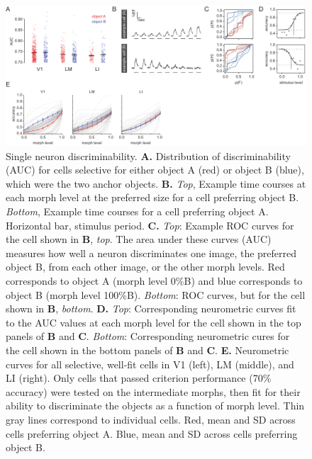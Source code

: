 \begin{figure}[t!]
    \includegraphics[width=\textwidth]{figures/chapter_4/fig_4-3_neurometric/fig_4-3_neurometric.pdf}
    \caption[Single neuron discriminability]{Single neuron discriminability. 
    \textbf{A.} Distribution of discriminability (AUC) for cells selective for either object A (red) or object B (blue), which were the two anchor objects.
    \textbf{B.} \textit{Top}, Example time courses at each morph level at the preferred size for a cell preferring object B. \textit{Bottom}, Example time courses for a cell preferring object A. Horizontal bar, stimulus period. 
    \textbf{C.} \textit{Top}: Example ROC curves for the cell shown in \textbf{B}, \textit{top}. The area under these curves (AUC) measures how well a neuron discriminates one image, the preferred object B, from each other image, or the other morph levels. Red corresponds to object A (morph level 0\%B) and blue corresponds to object B (morph level 100\%B). \textit{Bottom}: ROC curves, but for the cell shown in \textbf{B}, \textit{bottom}. 
    \textbf{D.} \textit{Top}: Corresponding neurometric curves fit to the AUC values at each morph level for the cell shown in the top panels of \textbf{B} and \textbf{C}. \textit{Bottom}: Corresponding neurometric cures for the cell shown in the bottom panels of \textbf{B} and \textbf{C}. 
    \textbf{E.} Neurometric curves for all selective, well-fit cells in V1 (left), LM (middle), and LI (right). Only cells that passed criterion performance (70\% accuracy) were tested on the intermediate morphs, then fit for their ability to discriminate the objects as a function of morph level. Thin gray lines correspond to individual cells. Red, mean and SD across cells preferring object A. Blue, mean and SD across cells preferring object B.
    \label{fig:neurometric}}
\end{figure}

